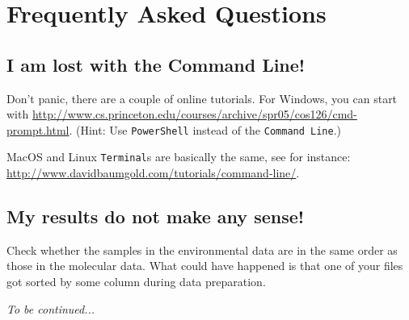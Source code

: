 \documentclass[a4paper,11pt]{article}
\newcommand{\prog}[1]{\texttt{#1}}
\begin{document}
\section{Frequently Asked Questions}

\subsection*{I am lost with the Command Line! \label{faq:commandline}}
Don't panic, there are a couple of online tutorials.
For Windows, you can start with \url{http://www.cs.princeton.edu/courses/archive/spr05/cos126/cmd-prompt.html}.
(Hint: Use \prog{PowerShell} instead of the \prog{Command Line}.)

MacOS and Linux \prog{Terminal}s are basically the same, see for instance: \url{http://www.davidbaumgold.com/tutorials/command-line/}. 

\subsection*{My results do not make any sense! \label{faq:nonsense}}
Check whether the samples in the environmental data are in the same order as those in the molecular data.
What could have happened is that one of your files got sorted by some column during data preparation.

\vspace{1cm}

\textit{To be continued...}
\clearpage

\printbibliography[heading=bibintoc]
\end{document}
